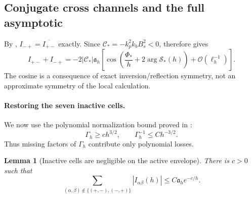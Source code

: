 \documentclass[11pt]{article}
\newtheorem{lemma}[theorem]{Lemma}
\newcommand{\cO}{\mathcal O}
\begin{document}
\subsection{Conjugate cross channels and the full asymptotic}\label{sec:full-hopping-asymptotic}
By ,
$I_{-+}=\overline{I_{+-}}$ exactly.  Since
$\mathscr C_*=-k_p^2k_bB_s^2<0$, 
therefore gives
\begin{equation}\label{eq:two-active-cosine}
 I_{+-}+I_{-+}
 =-2|\mathscr C_*|\mathfrak a_h
 \left[
 \cos\!\left(\frac{\Phi_*}{h}+2\arg \mathcal S_*(h)\right)
 +\cO(\ell_h^{-1})
 \right].
\end{equation}
The cosine is a consequence of exact inversion/reflection symmetry, not an
approximate symmetry of the local calculation.

\paragraph{Restoring the seven inactive cells.}
We now use the polynomial normalization bound proved in :
\begin{equation}\label{eq:Gamma-main-input}
 \Gamma_h\ge ch^{3/2},\qquad \Gamma_h^{-1}\le Ch^{-3/2}.
\end{equation}
Thus missing factors of $\Gamma_h$ contribute only polynomial losses.
\begin{lemma}[Inactive cells are negligible on the active envelope]
\label{lem:inactive-relative}
There is $c>0$ such that
\begin{equation}\label{eq:inactive-relative}
 \sum_{(\alpha,\beta)\notin\{(+,-),(-,+)\}}
 |I_{\alpha\beta}(h)|
 \le C\mathfrak a_he^{-c/h}.
\end{equation}
\end{lemma}
\end{document}
